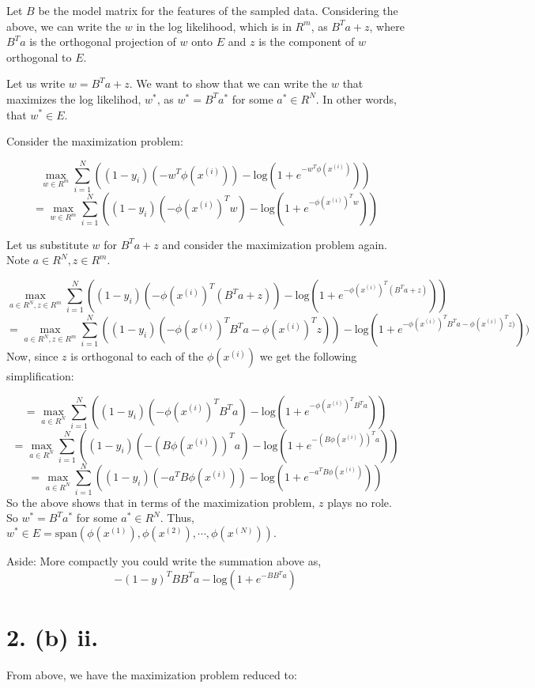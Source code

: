 \documentclass[]{article}
\begin{document}
Let \(B\) be the model matrix for the features of the sampled data.
Considering the above, we can write the \(w\) in the log likelihood,
which is in \(R^m\), as \(B^Ta + z\), where \(B^Ta\) is the orthogonal
projection of \(w\) onto \(E\) and \(z\) is the component of \(w\)
orthogonal to \(E\).

Let us write \(w = B^Ta + z\). We want to show that we can write the
\(w\) that maximizes the log likelihod, \(w^*\), as \(w^*=B^Ta^*\) for
some \(a^* \in R^N\). In other words, that \(w^* \in E\).

Consider the maximization problem:

\[\max_{w \in R^m} \displaystyle \sum_{i=1}^{N}((1-y_i)(-w^T\phi(x^{(i)}))-\text{log}(1+e^{-w^T\phi(x^{(i)})}))\]
\[=\max_{w \in R^m} \displaystyle \sum_{i=1}^{N}((1-y_i)(-\phi(x^{(i)})^Tw)-\text{log}(1+e^{-\phi(x^{(i)})^Tw}))\]

Let us substitute \(w\) for \(B^Ta + z\) and consider the maximization
problem again. Note \(a \in R^N, z \in R^m.\)

\[\max_{a \in R^N,z \in R^m} \displaystyle \sum_{i=1}^{N}((1-y_i)(-\phi(x^{(i)})^T(B^Ta + z))-\text{log}(1+e^{-\phi(x^{(i)})^T(B^Ta + z)}))\]
\[=\max_{a \in R^N,z \in R^m} \displaystyle \sum_{i=1}^{N}((1-y_i)(-\phi(x^{(i)})^TB^Ta -\phi(x^{(i)})^T z))-\text{log}(1+e^{-\phi(x^{(i)})^TB^Ta -\phi(x^{(i)})^Tz)}))\]
Now, since \(z\) is orthogonal to each of the \(\phi(x^{(i)})\) we get
the following simplification:

\[=\max_{a \in R^N} \displaystyle \sum_{i=1}^{N}((1-y_i)(-\phi(x^{(i)})^TB^Ta)-\text{log}(1+e^{-\phi(x^{(i)})^TB^Ta}))\]
\[=\max_{a \in R^N} \displaystyle \sum_{i=1}^{N}((1-y_i)(-(B\phi(x^{(i)}))^Ta)-\text{log}(1+e^{-(B\phi(x^{(i)}))^Ta}))\]
\[=\max_{a \in R^N} \displaystyle \sum_{i=1}^{N}((1-y_i)(-a^TB\phi(x^{(i)}))-\text{log}(1+e^{-a^TB\phi(x^{(i)})}))\]
So the above shows that in terms of the maximization problem, \(z\)
plays no role. So \(w^*=B^Ta^*\) for some \(a^* \in R^N\). Thus,
\(w^* \in E=\text{span}(\phi(x^{(1)}), \phi(x^{(2)}), \cdots, \phi(x^{(N)})).\)

Aside: More compactly you could write the summation above as,
\[-(1-y)^TBB^Ta-\text{log}(1+e^{-BB^Ta})\]

\hypertarget{b-ii.}{%
\section{2. (b) ii.}\label{b-ii.}}

From above, we have the maximization problem reduced to:
\end{document}
